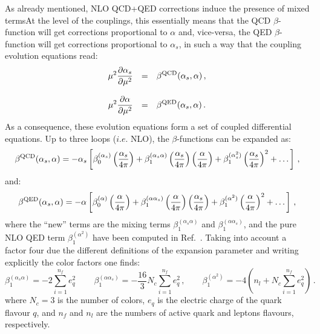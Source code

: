 As already mentioned, NLO QCD+QED corrections induce the presence of
mixed termsAt the level of the couplings, this essentially means that
the QCD $\beta$-function will get corrections proportional to $\alpha$
and, vice-versa, the QED $\beta$-function will get corrections
proportional to $\alpha_s$, in such a way that the coupling evolution
equations read:
\begin{equation}\label{CoupledEq}
\begin{array}{rcl}
\displaystyle \mu^2\frac{\partial \alpha_s}{\partial \mu^2} &=& \displaystyle
                                                \beta^{\rm QCD}(\alpha_s,\alpha)\,,\\
\\
\displaystyle \mu^2\frac{\partial \alpha}{\partial \mu^2} &=& \displaystyle \beta^{\rm QED}(\alpha_s,\alpha)\,.
\end{array}
\end{equation}
As a consequence, these evolution equations form a set of coupled
differential equations. Up to three loops ($i.e.$ NLO), the
$\beta$-functions can be expanded as:
\begin{equation}
\beta^{\rm QCD}(\alpha_s,\alpha) = -\alpha_s\left[\beta_0^{(\alpha_s)}\left(\frac{\alpha_s}{4\pi}\right)+\beta_1^{(\alpha_s\alpha)}\left(\frac{\alpha_s}{4\pi}\right) \left(\frac{\alpha}{4\pi}\right)+\beta_1^{(\alpha_s^2)}\left(\frac{\alpha_s}{4\pi}\right)^2+\dots\right]\,,
\end{equation}
and:
\begin{equation}
\beta^{\rm QED}(\alpha_s,\alpha) = -\alpha\left[\beta_0^{(\alpha)}\left(\frac{\alpha}{4\pi}\right)+\beta_1^{(\alpha\alpha_s)}\left(\frac{\alpha}{4\pi}\right) \left(\frac{\alpha_s}{4\pi}\right)+\beta_1^{(\alpha^2)}\left(\frac{\alpha}{4\pi}\right)^2+\dots\right]\,,
\end{equation}
where the ``new'' terms are the mixing terms
$\beta_1^{(\alpha_s\alpha)}$ and $\beta_1^{(\alpha\alpha_s)}$, and the
pure NLO QED term $\beta_1^{(\alpha^2)}$ have been computed in
Ref.~\cite{Surguladze:1996hx}. Taking into account a factor four due
the different definitions of the expansion parameter and writing
explicitly the color factors one finds:
\begin{equation}\label{eq:NewBetaTerms}
\beta_1^{(\alpha_s\alpha)} = -2\sum_{i=1}^{n_f}
e_q^2\,\qquad\beta_1^{(\alpha\alpha_s)} = -\frac{16}{3}N_c\sum_{i=1}^{n_f} e_q^2\,,\qquad \beta_1^{(\alpha^2)} = -4\left(n_l+N_c\sum_{i=1}^{n_f} e_q^2\right)\,.
\end{equation}
where $N_c=3$ is the number of colors, $e_q$ is the electric charge of
the quark flavour $q$, and $n_f$ and $n_l$ are the numbers of active
quark and leptons flavours, respectively.


